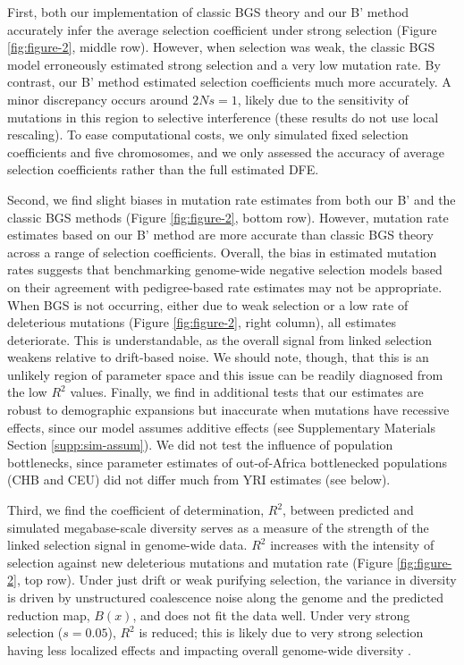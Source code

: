 \documentclass[11pt]{article}
\begin{document}
First, both our implementation of classic BGS theory and our B' method
accurately infer the average selection coefficient under strong selection
(Figure \ref{fig:figure-2}, middle row). However, when selection was weak, the
classic BGS model erroneously estimated strong selection and a very low
mutation rate. By contrast, our B' method estimated selection coefficients much
more accurately. A minor discrepancy occurs around $2Ns = 1$, likely
due to the sensitivity of mutations in this region to selective interference
(these results do not use local rescaling). 
To ease computational costs, we only simulated fixed selection coefficients and five chromosomes, 
and we only assessed the accuracy of average selection coefficients rather than the full estimated DFE.

Second, we find slight biases in mutation rate estimates from both our B' and the
classic BGS methods (Figure \ref{fig:figure-2}, bottom row). However, mutation
rate estimates based on our B' method are more accurate than classic BGS theory
across a range of selection coefficients. Overall, the bias in estimated
mutation rates suggests that benchmarking genome-wide negative selection models
based on their agreement with pedigree-based rate estimates may not be
appropriate. When BGS is not occurring, either due to weak selection or a low
rate of deleterious mutations (Figure \ref{fig:figure-2}, right column), all
estimates deteriorate. This is understandable, as the overall signal from
linked selection weakens relative to drift-based noise. We should note, though,
that this is an unlikely region of parameter space and this issue can be
readily diagnosed from the low $R^2$ values. Finally, we find in additional
tests that our estimates are robust to demographic expansions but inaccurate
when mutations have recessive effects, since our model assumes additive
effects (see Supplementary Materials Section \ref{supp:sim-assum}). We did not
test the influence of population bottlenecks, since parameter estimates of
out-of-Africa bottlenecked populations (CHB and CEU) did not differ much from
YRI estimates (see below).

Third, we find the coefficient of determination, $R^2$, between predicted and simulated megabase-scale diversity serves as a measure of the strength of the linked selection signal in genome-wide data. $R^2$ increases with the intensity of selection against new deleterious mutations and mutation rate (Figure \ref{fig:figure-2}, top
row). Under just drift or weak purifying selection, the variance in diversity is
driven by unstructured coalescence noise along the genome and the predicted
reduction map, $B(x)$, and does not fit the data well. Under very strong selection
($s=0.05$), $R^2$ is reduced; this is likely due to very strong selection
having less localized effects and impacting overall genome-wide diversity
\parencite{Santiago1995-hx,Robertson1961-ho}.
\end{document}
